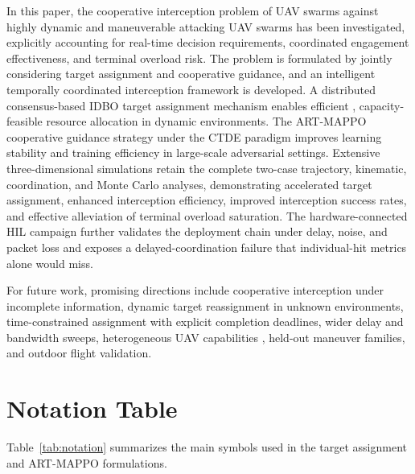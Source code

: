 \documentclass[lettersize,journal]{IEEEtran}
\providecommand{\DIFadd}[1]{{\protect\color{blue} #1}} %
\providecommand{\DIFdel}[1]{} %
\providecommand{\DIFaddbegin}{} %
\providecommand{\DIFaddend}{} %
\providecommand{\DIFdelbegin}{} %
\providecommand{\DIFdelend}{} %
\begin{document}
In this paper, the cooperative interception problem of UAV swarms against highly dynamic and
maneuverable attacking UAV swarms has been investigated, explicitly accounting for real-time
decision requirements, coordinated engagement effectiveness, and terminal overload risk.
The problem is formulated by jointly considering target assignment and cooperative guidance,
and an intelligent temporally coordinated interception framework is developed.
A \DIFdelbegin \DIFdel{fast IDBO-based }\DIFdelend \DIFaddbegin \DIFadd{distributed consensus-based IDBO }\DIFaddend target assignment mechanism enables
efficient\DIFdelbegin \DIFdel{and accurate }\DIFdelend \DIFaddbegin \DIFadd{, capacity-feasible }\DIFaddend resource allocation in dynamic environments.
The ART-MAPPO cooperative guidance strategy under the CTDE paradigm improves learning
stability and training efficiency in large-scale adversarial settings.
Extensive \DIFdelbegin \DIFdel{simulations demonstrate }\DIFdelend \DIFaddbegin \DIFadd{three-dimensional simulations retain the complete two-case trajectory,
kinematic, coordination, and Monte Carlo analyses, demonstrating }\DIFaddend accelerated
target assignment, enhanced interception efficiency, improved interception
success rates, and effective alleviation of terminal overload saturation. \DIFaddbegin \DIFadd{The
hardware-connected HIL campaign further validates the deployment chain under
delay, noise, and packet loss and exposes a delayed-coordination failure that
individual-hit metrics alone would miss.
}\DIFaddend 

For future work, promising directions include cooperative interception under incomplete
information, dynamic target reassignment in unknown environments, time-constrained assignment
with explicit completion deadlines, \DIFdelbegin \DIFdel{and integration with realistic constraints such as
communication delays, limited bandwidth , and }\DIFdelend \DIFaddbegin \DIFadd{wider delay and bandwidth sweeps,
}\DIFaddend heterogeneous UAV capabilities\DIFaddbegin \DIFadd{, held-out maneuver families, and outdoor flight
validation}\DIFaddend .




\appendices
\section{Notation Table}
\label{app:notation}

Table~\ref{tab:notation} summarizes the main symbols used in the target assignment and
ART-MAPPO formulations.
\end{document}

